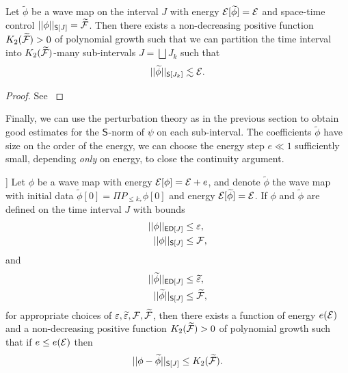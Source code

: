 \begin{lemma}
	Let $\widetilde \phi$ be a wave map on the interval $J$ with energy $\mathcal E[\widetilde \phi] = \mathcal E$ and space-time control $||\phi||_{\mathsf S[J]} = \widetilde {\mathcal F}$. Then there exists a non-decreasing positive function $K_2 (\widetilde {\mathcal F}) > 0$ of polynomial growth such that we can partition the time interval into $K_2 (\widetilde {\mathcal F})$-many sub-intervals $J = \bigsqcup J_k$ such that 
		\begin{equation}
			||\widetilde \phi||_{\mathsf S[J_k]} \lesssim \mathcal E.\label{eq:divis}
		\end{equation}
\end{lemma}

\begin{proof}
	See \cite[Section 10.2]{SterbenzTataru2010}
\end{proof}

Finally, we can use the perturbation theory as in the previous section to obtain good estimates for the $\mathsf S$-norm of $\psi$ on each sub-interval. The coefficients $\widetilde \phi$ have size on the order of the energy, we can choose the energy step $e \ll 1$ sufficiently small, depending \textit{only} on energy, to close the continuity argument. 

\begin{proposition}]\label{prop:highfreq}
	Let $\phi$ be a wave map with energy $\mathcal E[\phi] = \mathcal E + e$, and denote $\widetilde \phi$ the wave map with initial data $\widetilde \phi[0] = \Pi P_{\leq k_*} \phi[0]$ and energy $\mathcal E[\widetilde \phi] = \mathcal E$. If $\phi$ and $\widetilde \phi$ are defined on the time interval $J$ with bounds
		\begin{align}
			||\phi||_{\mathsf{ED}[J]} 
				&\leq \varepsilon, \\
			||\phi||_{\mathsf S[J]}
				&\leq \mathcal F, 	
		\end{align}
	and
		\begin{align}
			||\widetilde\phi||_{\mathsf{ED}[J]} 
				&\leq \widetilde{\varepsilon}, \\
			||\widetilde\phi||_{\mathsf S[J]}
				&\leq \widetilde{\mathcal F}, 	
		\end{align}	
	for appropriate choices of $\varepsilon, \widetilde{\varepsilon}, \mathcal F, \widetilde{\mathcal F}$, then there exists a function of energy $e(\mathcal E)$ and a non-decreasing positive function $K_2 (\widetilde {\mathcal F}) > 0$ of polynomial growth such that if $e \leq e(\mathcal E)$ then
		\begin{equation}
			||\phi - \widetilde \phi||_{\mathsf S[J]} \leq K_2 (\widetilde {\mathcal F}). 
		\end{equation}
\end{proposition}


